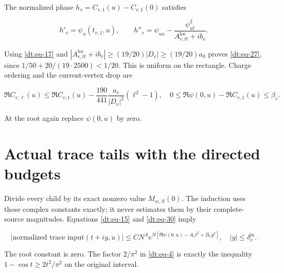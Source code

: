 The normalized phase \(h_v=C_{v,1}(u)-C_{v,1}(0)\) satisfies

\begin{equation}\label{dt:eq-36}
h'_v=\psi_u(t_{v,1},u),\qquad
 h''_v=\psi_{uu}
       -\frac{\psi_{ut}^2}{A_{v,tt}^{\mathrm{loc}}+ib_v}.
\end{equation}

Using \eqref{dt:eq-17} and \(|A_{v,tt}^{\mathrm{loc}}+ib_v|\ge(19/20)|D_v|\ge(19/20)a_0\) proves \eqref{dt:eq-27},
since \(1/50+20/(19\cdot2500)<1/20\). This is uniform on the rectangle.
Charge ordering and the current-vertex drop are

\begin{equation}\label{dt:eq-37}
\Re C_{v,\ell}(u)\le\Re C_{v,1}(u)
  -\frac{190}{441}\frac{a_v}{|D_v|^2}(\ell^2-1),
 \quad
 0\le\Re\psi(0,u)-\Re C_{v,1}(u)\le\beta_v.
\end{equation}

At the root again replace \(\psi(0,u)\) by zero.

\section{Actual trace tails with the directed budgets}\label{dt:sec-5}

Divide every child by its exact nonzero value \(M_{w,N}(0)\). The induction
uses those complex constants exactly; it never estimates them by their
complete-source magnitudes. Equations \eqref{dt:eq-15} and \eqref{dt:eq-30} imply

\begin{equation}\label{dt:eq-38}
|\text{normalized trace input}(t+iy,u)|
 \le CN^A
   e^{N[\Re\psi(0,u)-A_vt^2+B_vy^2]},
                      \quad |y|\le\delta_v^{\mathrm{in}}.
\end{equation}

The root constant is zero. The factor \(2/\pi^2\) in \eqref{dt:eq-4} is exactly the
inequality \(1-\cos t\ge2t^2/\pi^2\) on the original interval.

